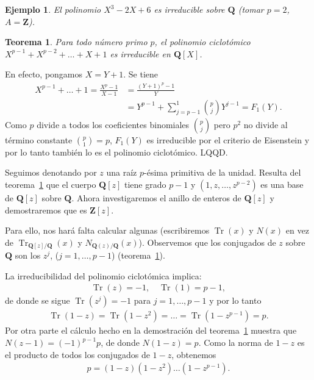 \documentclass[bibtotoc,leqno,spanish]{amsbook}
\let\emph\relax %
\newcommand{\QQ}{\mathbf{Q}}
\newcommand{\ZZ}{\mathbf{Z}}
\newcommand{\QED}{LQQD.}
\DeclareMathOperator{\Tr}{Tr}
\numberwithin{equation}{section}
\theoremstyle{note}
\theoremstyle{note}
\newtheorem{theorem}{Teorema}
\theoremstyle{rem}
\newtheorem*{example*}{Ejemplo}
\numberwithin{theorem}{section}
\numberwithin{proposition}{section}
\numberwithin{definition}{section}
\numberwithin{lemma}{section}
\numberwithin{corollary}{section}
\numberwithin{example}{section}
\numberwithin{footnote}{section}%
\begin{document}
\begin{example*}
El polinomio $X^{3}-2X+6$ es irreducible sobre $\QQ$ (tomar $p=2$, $A=\ZZ$).
\end{example*}

\begin{theorem}\label{teo2.9.1}
Para todo n\'umero primo $p$, el polinomio ciclot\'omico $X^{p-1}+X^{p-2}+\dots+X+1$ es irreducible
en $\QQ[X]$.
\end{theorem}

En efecto, pongamos $X = Y+1$. Se tiene
\begin{align*}
X^{p-1}+\dots+1 = \frac{X^{p}-1}{X-1} &= \frac{(Y+1)^{p}-1}{Y}\\
&=Y^{p-1}+\sum_{j=p-1}^{1}\binom{p}{j}Y^{j-1}=F_{1}(Y).
\end{align*}
Como $p$ divide a todos los coeficientes binomiales $\binom{p}{j}$ pero $p^{2}$ no divide al
t\'ermino constante $\binom{p}{1} = p$, $F_{1}(Y)$ es irreducible por el criterio de Eisenstein y
por lo tanto tambi\'en lo es el polinomio ciclot\'omico. \QED

Seguimos denotando por $z$ una ra\'iz $p$-\'esima primitiva de la unidad. Resulta del
teorema~\ref{teo2.9.1} que el cuerpo
$\QQ[z]$ tiene grado $p-1$ y $(1,z,\dots,z^{p-2})$ es una base de  $\QQ[z]$ sobre $\QQ$. Ahora investigaremos el
anillo de enteros de $\QQ[z]$ y demostraremos que es $\ZZ[z]$.

Para ello, nos har\'a falta calcular algunas \emph{trazas y normas} (escribiremos $\Tr(x)$ y $N(x)$ en vez
de $\Tr_{\QQ[z]/\QQ}(x)$ y $N_{\QQ(z)/\QQ}(x)$). Observemos que los conjugados de $z$ sobre $\QQ$ son los
$z^{j}$, ($j=1,\dots,p-1$) (teorema~\ref{teo2.9.1}).

La irreducibilidad del polinomio ciclot\'omica implica:
\begin{gather}\label{eq-2.9-1}
\Tr(z) = -1,\quad\Tr(1)=p-1,
\end{gather}
de donde se sigue $\Tr(z^{j}) = -1$ para $j=1,\dots,p-1$ y por lo tanto
\begin{gather}\label{eq-2.9-2}
\Tr(1-z) = \Tr(1-z^{2})=\dots=\Tr(1-z^{p-1}) = p.
\end{gather}
Por otra parte el c\'alculo hecho en la demostraci\'on del teorema~\ref{teo2.9.1} muestra que $N(z-1)=(-1)^{p-1}p$, de donde
$N(1-z)=p$. Como la norma de $1-z$ es el producto de todos los conjugados de $1-z$, obtenemos
\begin{gather}\label{eq-2.9-3}
p=(1-z)(1-z^{2})\dots(1-z^{p-1}).
\end{gather}
\end{document}

